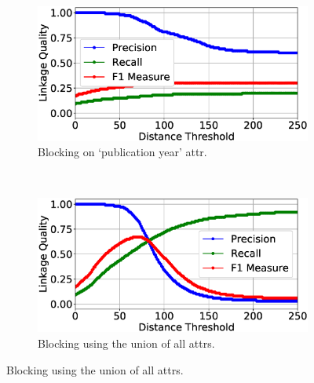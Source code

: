 \documentclass{llncs}
\begin{document}
\begin{figure}
\begin{subfigure}{.47\textwidth}
  \centering
\includegraphics[width=\textwidth]{figures/plotLQ-cora-trad-year}
\vspace{-6mm}
\caption{Blocking on `publication year' attr.}
\end{subfigure}%
~~
\begin{subfigure}{.47\textwidth}
  \centering
\includegraphics[width=\textwidth]{figures/plotLQ-cora-trad-combined}
\vspace{-6mm}
\caption{Blocking using the union of all attrs.}
\end{subfigure} \vspace{4mm}


\end{figure}
\end{document}
